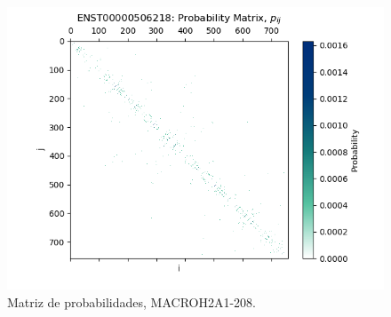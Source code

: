 \documentclass[a4paper,11pt,titlepage]{article}
\theoremstyle{definition}
\begin{document}
\begin{figure}[H]
    \hfill
    \begin{minipage}[c]{0.31\textwidth}
        \centering
        \includegraphics[width=\textwidth]{images/MACROH2A1-208-db_iter-matrix.png}
        \caption{Matriz de probabilidades, MACROH2A1-208.}
        \label{fig:MACROH2A1-208-matrix}
    \end{minipage}
\end{figure}
\end{document}
